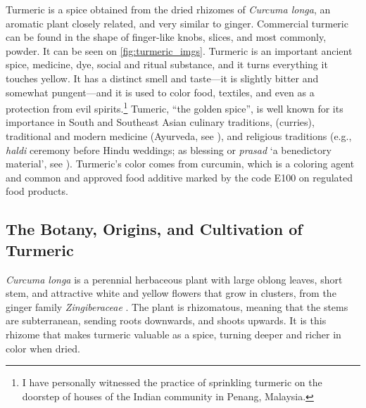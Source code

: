 Turmeric is a spice obtained from the dried rhizomes of \textit{Curcuma longa}, an aromatic plant closely related, and very similar to ginger. Commercial turmeric can be found in the shape of finger-like knobs, slices, and most commonly, powder. It can be seen on \cref{fig:turmeric_imgs}. Turmeric is an important ancient spice, medicine, dye, social and ritual substance, and it turns everything it touches yellow. It has a distinct smell and taste---it is slightly bitter and somewhat pungent---and it is used to color food, textiles, and even as a protection from evil spirits.\footnote{I have personally witnessed the practice of sprinkling turmeric on the doorstep of houses of the Indian community in Penang, Malaysia.} Tumeric, ``the golden spice'', is well known for its importance in South and Southeast Asian culinary traditions, (curries), traditional and modern medicine (\gls{Ayurveda}, see \textcite{prasad_turmeric_2011}), and religious traditions (e.g., \textit{haldi} ceremony before Hindu weddings; as blessing or \textit{prasad} `a benedictory material', see \textcite{nair_turmeric_2019}). Turmeric's color comes from curcumin, which is a coloring agent and common and approved food additive marked by the code E100 on regulated food products.

\subsection{The Botany, Origins, and Cultivation of Turmeric}



\textit{Curcuma longa} is a perennial herbaceous plant with large oblong leaves, short stem, and attractive white and yellow flowers that grow in clusters, from the ginger family \textit{Zingiberaceae} \autocite[128]{van_wyk_culinary_2014}. The plant is rhizomatous, meaning that the stems are subterranean, sending roots downwards, and shoots upwards. It is this rhizome that makes turmeric valuable as a spice, turning deeper and richer in color when dried.

